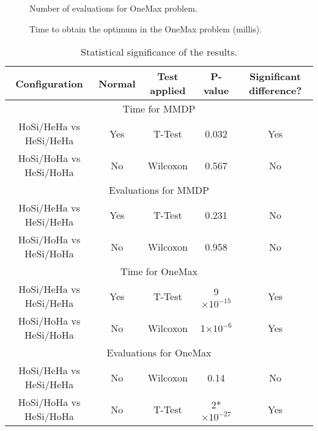 \documentclass{sig-alternate}
\providecommand{\e}[1]{\ensuremath{\times 10^{#1}}}
\begin{document}
\begin{figure}
\centering
{}
\caption{Number of evaluations for OneMax problem.}
\end{figure}

\begin{figure}
\centering
{}
\caption{Time to obtain the optimum in the OneMax problem (millis).}
\end{figure}


\begin{table*}
\centering
\caption{Statistical significance of the results.}
\begin{tabular}{|c|c|c|c|c|} \hline

Configuration			&Normal	&Test applied			&P-value & Significant difference?\\ \hline
\multicolumn{5}{|c|}{Time for MMDP} \\ \hline
HoSi/HeHa vs HeSi/HeHa	&Yes	&T-Test			&0.032 	 & Yes \\ \hline
HoSi/HoHa vs HeSi/HoHa	&No		&Wilcoxon		&0.567 	 & No \\ \hline
\multicolumn{5}{|c|}{Evaluations for MMDP}	\\ \hline
HoSi/HeHa vs HeSi/HeHa	&Yes	&T-Test			&0.231  & No \\ \hline
HoSi/HoHa vs HeSi/HoHa	&No		&Wilcoxon		&0.958  & No \\ \hline
\multicolumn{5}{|c|}{Time for OneMax} \\ \hline
HoSi/HeHa vs HeSi/HeHa	& Yes	& T-Test		&  9\e{-15} & Yes \\ \hline
HoSi/HoHa vs HeSi/HoHa	& No	& Wilcoxon		& 	1\e{-6}		& Yes \\ \hline
\multicolumn{5}{|c|}{Evaluations for OneMax}	\\ \hline
HoSi/HeHa vs HeSi/HeHa	& No	& Wilcoxon 		&	0.14 		& No\\ \hline
HoSi/HoHa vs HeSi/HoHa	& No	& T-Test		&	2*\e{-27}	& Yes \\ \hline
\end{tabular}
\label{tab:significance}
\end{table*}

\end{document}
